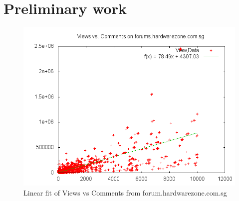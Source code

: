 \documentclass{article}
\begin{document}
\section{Preliminary work}
\begin{figure}
	\includegraphics[scale=0.5]{view-comment.png}
	\caption{Linear fit of Views vs Comments from forum.hardwarezone.com.sg}
\end{figure}



\end{document}
